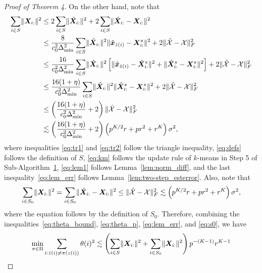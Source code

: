 \documentclass[lettersize,onecolumn,journal]{IEEEtran}
\theoremstyle{definition}
\theoremstyle{definition}
\newcommand{\of}[1]{\left(#1\right)}
\newcommand{\off}[1]{\left[#1\right]}
\begin{document}
\begin{proof}[Proof of Theorem 4]
    On the other hand, note that 
    \begin{align}
         \sum_{i \in S} \onormSize{}{\mX_{i:}}^2 & \leq 2 \sum_{i \in S} \onormSize{}{\hat \mX_{i:}}^2  +  2\sum_{i \in S} \onormSize{}{\hat \mX_{i:} - \mX_{i:}}^2 \label{eq:tr1}\\
         & \leq \frac{8}{c_0^2 \Delta_{\min}^2  } \sum_{i \in S} \onormSize{}{\hat \mX_{i:}}^2   \onormSize{}{\hat \mx_{\hat z(i)} - \mX_{i:}^s }^2 +2 \onormSize{}{\hat \tX - \tX}_F^2 \label{eq:defs} \\
         & \leq \frac{16}{c_0^2 \Delta_{\min}^2  }\sum_{i \in S} \onormSize{}{\hat \mX_{i:}}^2  \off{ \onormSize{}{\hat \mx_{\hat z(i)} - \hat \mX_{i:}^s }^2 + \onormSize{}{\hat \mX_{i:}^s - \mX_{i:}^s }^2 } + 2\onormSize{}{\hat \tX - \tX}_F^2 \label{eq:tr2} \\
         & \leq  \frac{16(1 + \eta)}{c_0^2 \Delta_{\min}^2 }\sum_{i \in S} \onormSize{}{\hat \mX_{i:}}^2  \onormSize{}{\hat \mX_{i:}^s - \mX_{i:}^s }^2  + 2\onormSize{}{\hat \tX - \tX}_F^2 \label{eq:km} \\
         & \leq \of{ \frac{16(1 + \eta)}{c_0^2 \Delta_{\min}^2 } + 2 }\onormSize{}{\hat \tX - \tX}_F^2 \label{eq:lem1}\\
         & \lesssim \of{ \frac{16(1 + \eta)}{c_0^2 \Delta_{\min}^2 } + 2 } \of{ p^{K/2}r + pr^2 + r^K } \sigma^2 \label{eq:lem_err},
    \end{align}
    where inequalities \eqref{eq:tr1} and \eqref{eq:tr2} follow the triangle inequality, \eqref{eq:defs} follows the definition of $S$, \eqref{eq:km} follows the update rule of $k$-means in Step 5 of Sub-Algorithm~\hyperref[alg:main]{1}, \eqref{eq:lem1} follows Lemma~\ref{lem:norm_diff}, and the last inequality~\eqref{eq:lem_err} follows Lemma~\ref{lem:two-step_esterror}. Also, note that 
    \begin{equation}\label{eq:s0}
         \sum_{i \in S_0} \onormSize{}{\mX_{i:}}^2 =  \sum_{i \in S_0} \onormSize{}{\hat \mX_{i:}- \mX_{i:}}^2 \leq \onormSize{}{\hat \tX - \tX}_F^2 \lesssim \of{ p^{K/2}r + pr^2 + r^K } \sigma^2,
    \end{equation}
    where the equation follows by the definition of $S_0$. Therefore, combining the inequalities~\eqref{eq:theta_bound}, \eqref{eq:theta_p}, \eqref{eq:lem_err}, and \eqref{eq:s0}, we have 
    \begin{align}
        \min_{\pi \in \Pi} \sum_{i : \hat z(i) \neq \pi(z(i))} \theta(i)^2  &\lesssim \of{\sum_{i \in S} \onormSize{}{\mX_{i:}}^2 + \sum_{i \in S_0} \onormSize{}{\mX_{i:}}^2  } p^{-(K-1)} r^{K-1} \\

\end{align}
\end{proof}
\end{document}
